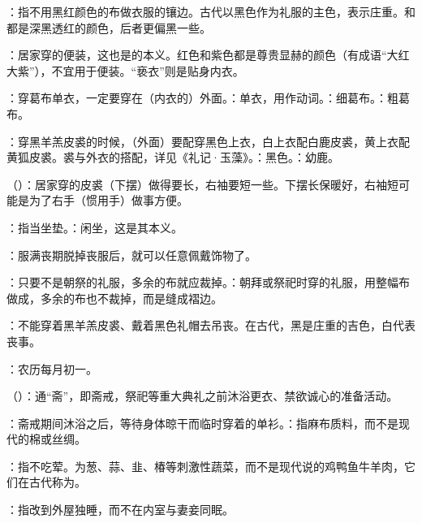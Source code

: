 {
\item {}：指不用黑红颜色的布做衣服的镶边。古代以黑色作为礼服的主色，表示庄重。和都是深黑透红的颜色，后者更偏黑一些。
\item {}：居家穿的便装，这也是的本义。红色和紫色都是尊贵显赫的颜色（有成语“大红大紫”），不宜用于便装。“亵衣”则是贴身内衣。
\item {}：穿葛布单衣，一定要穿在（内衣的）外面。：单衣，用作动词。：细葛布。：粗葛布。
\item {}：穿黑羊羔皮裘的时候，（外面）要配穿黑色上衣，白上衣配白鹿皮裘，黄上衣配黄狐皮裘。裘与外衣的搭配，详见《礼记·玉藻》。：黑色。：幼鹿。
\item {}（）：居家穿的皮裘（下摆）做得要长，右袖要短一些。下摆长保暖好，右袖短可能是为了右手（惯用手）做事方便。
\item {}：指当坐垫。：闲坐，这是其本义。
\item {}：服满丧期脱掉丧服后，就可以任意佩戴饰物了。
\item {}：只要不是朝祭的礼服，多余的布就应裁掉。：朝拜或祭祀时穿的礼服，用整幅布做成，多余的布也不裁掉，而是缝成褶边。
\item {}：不能穿着黑羊羔皮裘、戴着黑色礼帽去吊丧。在古代，黑是庄重的吉色，白代表丧事。
\item {}：农历每月初一。
}
{}


{
\item {}（）：通“斋”，即斋戒，祭祀等重大典礼之前沐浴更衣、禁欲诚心的准备活动。
\item {}：斋戒期间沐浴之后，等待身体晾干而临时穿着的单衫。：指麻布质料，而不是现代的棉或丝绸。
\item {}：指不吃荤。为葱、蒜、韭、椿等刺激性蔬菜，而不是现代说的鸡鸭鱼牛羊肉，它们在古代称为。%
\item {}：指改到外屋独睡，而不在内室与妻妾同眠。
}
{}


